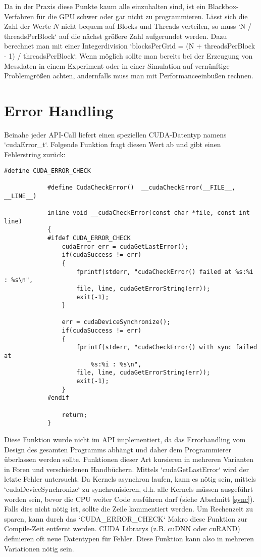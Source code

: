         Da in der Praxis diese Punkte kaum alle einzuhalten sind, ist ein Blackbox-Verfahren für die GPU schwer oder gar nicht zu programmieren. Lässt sich die Zahl der Werte $N$ nicht bequem auf \Glspl{Block} und \Glspl{Thread} verteilen, so muss \li`N / threadsPerBlock` auf die nächst größere Zahl aufgerundet werden. Dazu berechnet man mit einer Integerdivision \li`blocksPerGrid = (N + threadsPerBlock - 1) / threadsPerBlock`. Wenn möglich sollte man bereits bei der Erzeugung von Messdaten in einem Experiment oder in einer Simulation auf vernünftige Problemgrößen achten, andernfalls muss man mit \Gls{Performance}einbußen rechnen.
        								
		\section{Error Handling}
		Beinahe jeder \Gls{API}-Call liefert einen speziellen CUDA-Datentyp namens \li`cudaError_t`. Folgende Funktion fragt diesen Wert ab und gibt einen Fehlerstring zurück:		
		\begin{lstlisting}[caption=Error Handling]
			#define CUDA_ERROR_CHECK

			#define CudaCheckError()  __cudaCheckError(__FILE__, __LINE__)

			inline void __cudaCheckError(const char *file, const int line)
			{
			#ifdef CUDA_ERROR_CHECK
				cudaError err = cudaGetLastError();
				if(cudaSuccess != err)
				{
					fprintf(stderr, "cudaCheckError() failed at %s:%i : %s\n",
					file, line, cudaGetErrorString(err));
					exit(-1);
				}

    			err = cudaDeviceSynchronize();
    			if(cudaSuccess != err)
    			{
        			fprintf(stderr, "cudaCheckError() with sync failed at 
        				%s:%i : %s\n",
					file, line, cudaGetErrorString(err));
					exit(-1);
				}
			#endif

				return;
			}
		\end{lstlisting}
		
		Diese Funktion wurde nicht im \Gls{API} implementiert, da das Errorhandling vom Design des gesamten Programms abhängt und daher dem Programmierer überlassen werden sollte. Funktionen dieser Art kursieren in mehreren Varianten in Foren und verschiedenen Handbüchern. Mittels \li`cudaGetLastError` wird der letzte Fehler untersucht. Da \Glspl{Kernel} asynchron laufen, kann es nötig sein, mittels \li`cudaDeviceSynchronize` zu synchronisieren, d.h. alle \Glspl{Kernel} müssen ausgeführt worden sein, bevor die CPU weiter Code ausführen darf (siehe Abschnitt \ref{sync}). Falls dies nicht nötig ist, sollte die Zeile kommentiert werden. Um Rechenzeit zu sparen, kann durch das \li`CUDA_ERROR_CHECK` Makro diese Funktion zur Compile-Zeit entfernt werden. CUDA Librarys (z.B. cuDNN oder cuRAND) definieren oft neue Datentypen für Fehler. Diese Funktion kann also in mehreren Variationen nötig sein.


